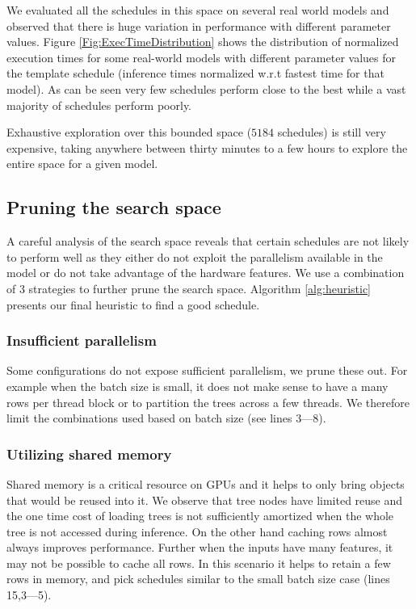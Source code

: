 We evaluated all the schedules in this space on several real world models and observed that 
there is huge variation in performance with different parameter values. 
Figure \ref{Fig:ExecTimeDistribution} shows the distribution of normalized execution times
for some real-world models with different parameter values for the template schedule (inference
times normalized w.r.t fastest time for that model).
As can be seen very few schedules perform close to the best while a vast majority of
schedules perform poorly.

Exhaustive exploration over this bounded space ($5184$ schedules) is still very expensive, taking
anywhere between thirty minutes to a few hours to explore the entire space for a given model. 

\subsection{Pruning the search space}
 
A careful analysis of the search space reveals that certain schedules are not likely to 
perform well as they either do not exploit the parallelism available in the model or do not take advantage of the hardware features.
We use a combination of 3 strategies to further prune the search space.
Algorithm \ref{alg:heuristic} presents our final heuristic to find a good schedule.

\subsubsection*{Insufficient parallelism}
 Some configurations do not expose sufficient parallelism, we prune these out.
  For example when the batch size is small, it does not make sense to have a many rows
  per thread block or to partition the trees across a few threads. 
  We therefore limit the combinations used based on batch size (see lines 3---8).
\subsubsection*{Utilizing shared memory}
  Shared memory is a critical resource on GPUs and it helps to only bring objects that would be reused into it. 
  We observe that tree nodes have limited reuse and the one time cost of loading trees is not sufficiently amortized when the whole tree is not accessed during inference. 
  On the other hand caching rows 
  almost always improves performance. Further when the inputs have many features, it may not be possible to cache all rows.
  In this scenario it helps to retain a few rows in memory, and pick schedules similar to the small batch size case (lines 15,3---5).

